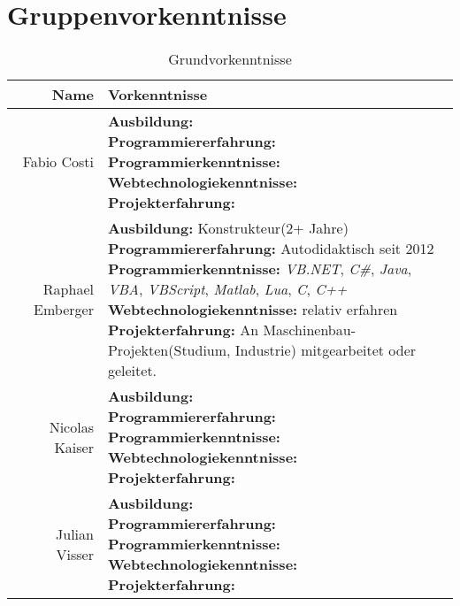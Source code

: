 \documentclass[10pt,a4paper,titlepage,twoside,german]{zhawreprt}
\begin{document}
\chapter{Gruppenvorkenntnisse}\label{chp:KnowHow}
\begin{table}[h!]
\begin{tabular}{|r|l|}
\hline
\textbf{Name} & \textbf{Vorkenntnisse}\\\hline\hline
Fabio Costi &
\parbox[t]{11cm}{\textbf{Ausbildung:}\\
\textbf{Programmiererfahrung:}\\
\textbf{Programmierkenntnisse:}\\
\textbf{Webtechnologiekenntnisse:}\\
\textbf{Projekterfahrung:}
}\\\hline
Raphael Emberger &
\parbox[t]{11cm}{\textbf{Ausbildung:} Konstrukteur(2+ Jahre)\\
\textbf{Programmiererfahrung:} Autodidaktisch seit 2012\\
\textbf{Programmierkenntnisse:} \emph{VB.NET}, \emph{C\#}, \emph{Java}, \emph{VBA}, \emph{VBScript}, \emph{Matlab}, \emph{Lua}, \emph{C}, \emph{C++}\\
\textbf{Webtechnologiekenntnisse:} relativ erfahren\\
\textbf{Projekterfahrung:} An Maschinenbau-Projekten(Studium, Industrie) mitgearbeitet oder geleitet.
}\\\hline
Nicolas Kaiser &
\parbox[t]{11cm}{\textbf{Ausbildung:}\\
\textbf{Programmiererfahrung:}\\
\textbf{Programmierkenntnisse:}\\
\textbf{Webtechnologiekenntnisse:}\\
\textbf{Projekterfahrung:}
}\\\hline
Julian Visser &
\parbox[t]{11cm}{\textbf{Ausbildung:}\\
\textbf{Programmiererfahrung:}\\
\textbf{Programmierkenntnisse:}\\
\textbf{Webtechnologiekenntnisse:}\\
\textbf{Projekterfahrung:}
}\\\hline
\end{tabular}\caption{Grundvorkenntnisse}\label{tbl:KnowHow}
\end{table}
\end{document}
